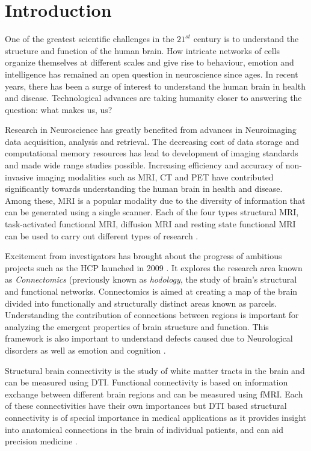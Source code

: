 \documentclass[msthesis.tex]{subfiles}
\begin{document}
\chapter{Introduction}
One of the greatest scientific challenges in the $21^{st}$ century is to understand the structure and function of the human brain. How intricate networks of cells organize themselves at different scales and give rise to behaviour, emotion and intelligence has remained an open question in neuroscience since ages. In recent years, there has been a surge of interest to understand the human brain in health and disease. Technological advances are taking humanity closer to answering the question: what makes us, us? 

Research in Neuroscience has greatly benefited from advances in Neuroimaging data acquisition, analysis and retrieval. The decreasing cost of data storage and computational memory resources has lead to development of imaging standards and made wide range studies possible. Increasing efficiency and accuracy of non-invasive imaging modalities such as \gls{MRI}, \gls{CT} and \gls{PET} have contributed significantly towards understanding the human brain in health and disease. Among these, \gls{MRI} is a popular modality due to the diversity of information that can be generated using a single scanner. Each of the four types structural MRI, task-activated functional \gls{MRI}, diffusion \gls{MRI} and resting state functional \gls{MRI} can be used to carry out different types of research \citep{van2016human}. 

Excitement from investigators has brought about the progress of ambitious projects such as the \gls{HCP} launched in 2009 \citep{van2016human}. It explores the research area known as \textit{Connectomics} (previously known as \textit{hodology}, the study of brain's structural and functional networks. Connectomics is aimed at creating a map of the brain divided into functionally and structurally distinct areas known as parcels. Understanding the contribution of connections between regions is important for analyzing the emergent properties of brain structure and function. This framework is also important to understand defects caused due to Neurological disorders as well as emotion and cognition \citep{sala2015reorganization}. 

Structural brain connectivity is the study of white matter tracts in the brain and can be measured using \gls{DTI}. Functional connectivity is based on information exchange between different brain regions and can be measured using \gls{fMRI}. Each of these connectivities have their own importances but \gls{DTI} based structural connectivity is of special importance in medical applications as it provides insight into anatomical connections in the brain of individual patients, and can aid precision medicine \citep{cociu2017multimodal}.
\end{document}
